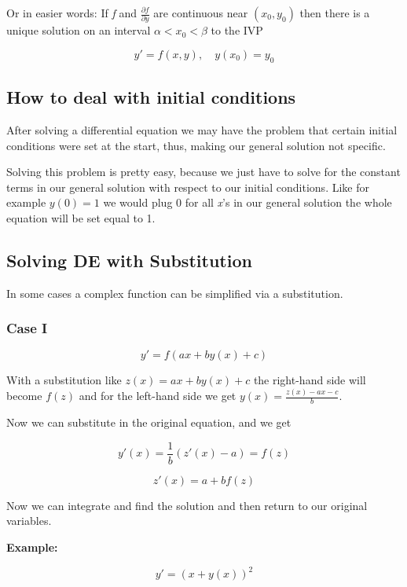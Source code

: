 Or in easier words: If \emph{f} and \(\frac{\partial f}{\partial y}\) are continuous near \((x_0, y_0)\) 
then there is a unique solution on an interval \(\alpha < x_0 < \beta\) to the IVP

\[
    y' = f(x,y), \quad y(x_0) = y_0
\]

\subsection{How to deal with initial conditions}

After solving a differential equation we may have the problem that certain initial
conditions were set at the start, thus, making our general solution not specific.
\vspace{\baselineskip}

Solving this problem is pretty easy, because we just have to solve for the constant terms
in our general solution with respect to our initial conditions. Like for example \(y(0) = 1\)
we would plug 0 for all \emph{x}'s in our general solution the whole equation will be set equal to 1.

\subsection{Solving DE with Substitution}

In some cases a complex function can be simplified via a substitution.

\subsubsection{Case I}

\[
    y' = f(ax + by(x) + c)
\]

With a substitution like \(z(x) = ax + by(x) + c\) the right-hand side will become \(f(z)\)
and for the left-hand side we get \(y(x) = \frac{z(x) - ax - c}{b}\).
\vspace{\baselineskip}

Now we can substitute in the original equation, and we get

\[
    y'(x) = \frac{1}{b} (z'(x) - a) = f(z)
\]

\[
    z'(x) = a + b f(z)
\]

Now we can integrate and find the solution and then return to our original variables.
\vspace{\baselineskip}

\textbf{Example:}

\[
    y' = (x + y(x))^2
\]


